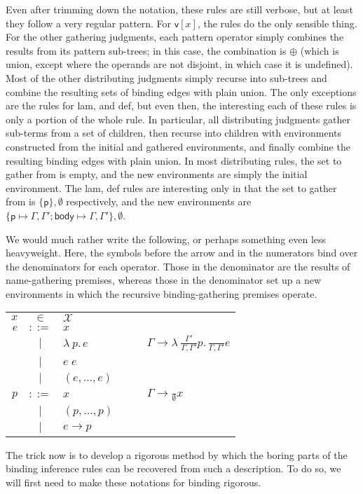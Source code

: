 \documentclass[11pt]{article} %
\theoremstyle{definition}
\newcommand{\fn}{\lambda\:\!}
\begin{document}
Even after trimming down the notation, these rules are still verbose, but at least they follow a very regular pattern.
For $\mathsf{v}[x]$, the rules do the only sensible thing.
For the other gathering judgments, each pattern operator simply combines the results from its pattern sub-trees; in this case, the combination is $\oplus$ (which is union, except where the operands are not disjoint, in which case it is undefined).
Most of the other distributing judgments simply recurse into sub-trees and combine the resulting sets of binding edges with plain union.
The only exceptions are the rules for \textsf{lam}, and \textsf{def}, but even then, the interesting each of these rules is only a portion of the whole rule.
In particular, all distributing judgments gather sub-terms from a set of children, then recurse into children with environments constructed from the initial and gathered environments, and finally combine the resulting binding edges with plain union.
In most distributing rules, the set to gather from is empty, and the new environments are simply the initial environment.
The \textsf{lam, def} rules are interesting only in that the set to gather from is $\{\mathsf{p}\}, \emptyset$ respectively, and the new environments are $\{\mathsf{p} \mapsto \Gamma,\Gamma'; \mathsf{body} \mapsto \Gamma,\Gamma'\}, \emptyset$.



We would much rather write the following, or perhaps something even less heavyweight.
Here, the symbols before the arrow and in the numerators bind over the denominators for each operator.
Those in the denominator are the results of name-gathering premises, whereas those in the denominator set up a new environments in which the recursive binding-gathering premises operate.
\newline
\begin{tabular}{rclcl}
$x$ & $\in$ & $\mathcal{X}$ &$\quad$& \\
$e$ & $::=$ & $x$ &&  \\
& $\mid$ & $\fn p.\,e$ && $\Gamma \to \fn \frac{\Gamma'}{\Gamma,\Gamma'}p.\, \frac{}{\Gamma,\Gamma'}e$ \\
& $\mid$ & $e\;e$ &&  \\
& $\mid$ & $(e, \ldots, e)$ &&  \\
$p$ & $::=$ & $x$ && $\Gamma \to \frac{}{\emptyset}x$ \\
& $\mid$ & $(p, \ldots, p)$ &&  \\
& $\mid$ & $e \to p$ &&  \\
\end{tabular}
\newline
The trick now is to develop a rigorous method by which the boring parts of the binding inference rules can be recovered from such a description.
To do so, we will first need to make these notations for binding rigorous.
\end{document}

